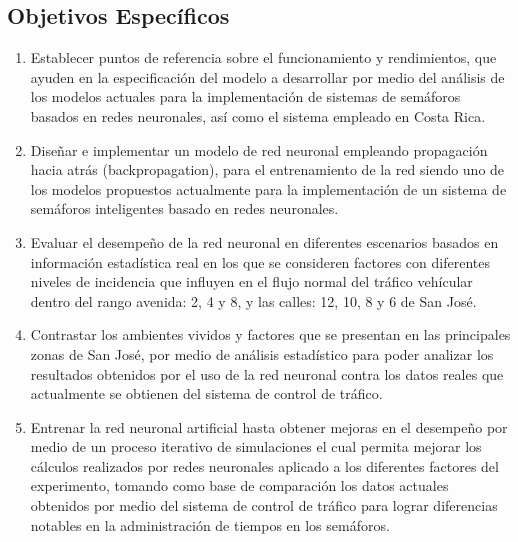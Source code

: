 	\subsection{Objetivos Espec\'{i}ficos}
	\begin{enumerate}
	  \item Establecer puntos de referencia sobre el funcionamiento y rendimientos,
	  que ayuden en la especificaci\'{o}n del modelo a desarrollar por medio del
	  an\'{a}lisis de los modelos actuales para la implementaci\'{o}n de sistemas
	  de sem\'{a}foros basados en redes neuronales, as\'{i} como el sistema empleado en Costa Rica.
	  
	  \item Dise\~{n}ar e implementar un modelo de red neuronal empleando
	  propagaci\'{o}n hacia atr\'{a}s (backpropagation), para el entrenamiento de
	  la red siendo uno de los modelos propuestos actualmente para la implementaci\'{o}n de un sistema de sem\'{a}foros inteligentes basado en redes neuronales.
	  \item Evaluar el desempe\~{n}o de la red neuronal en diferentes escenarios
	  basados en informaci\'{o}n estad\'{i}stica real  en
	  los que se consideren factores con diferentes niveles de incidencia que
	  influyen en el flujo normal del tr\'{a}fico veh\'{i}cular dentro del rango avenida: 2, 4 y 8,  y las calles: 12, 10, 8 y 6 de San Jos\'{e}.
	  \item Contrastar los ambientes vividos y factores que se presentan en las
	  principales zonas de San Jos\'{e}, por medio de an\'{a}lisis estad\'{i}stico
	  para poder analizar los resultados obtenidos por el uso de la red neuronal
	  contra los datos reales que actualmente se obtienen del sistema de control de
	  tr\'{a}fico.
	  \item Entrenar la red neuronal artificial hasta obtener mejoras en el
	  desempe\~{n}o por medio de un proceso iterativo de simulaciones el
	  cual permita mejorar los c\'{a}lculos realizados por redes neuronales
	  aplicado a los diferentes factores del experimento, tomando como base de
	  comparaci\'{o}n los datos actuales obtenidos por medio del sistema de control
	  de tr\'{a}fico para lograr diferencias notables en la administraci\'{o}n de tiempos en los sem\'{a}foros.
	  
	\end{enumerate}
